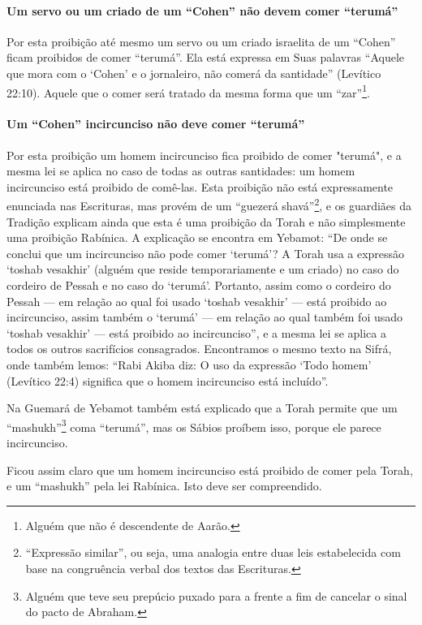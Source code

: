 \paragraph{Um servo ou um criado de um ``Cohen'' não devem comer ``terumá''}

Por esta proibição até mesmo um servo ou um criado israelita de um
``Cohen'' ficam proibidos de comer ``terumá''. Ela está expressa em Suas
palavras ``Aquele que mora com o `Cohen' e o jornaleiro, não comerá da
santidade'' (Levítico 22:10). Aquele que o comer será tratado da mesma
forma que um ``zar''\footnote{Alguém que não é descendente de Aarão.}.

\paragraph{Um ``Cohen'' incircunciso não deve comer ``terumá''}

Por esta proibição um homem incircunciso fica proibido de comer
"terumá", e a mesma lei se aplica no caso de todas as outras santidades:
um homem incircunciso está proibido de comê-las. Esta proibição não está
expressamente enunciada nas Escrituras, mas provém de um ``guezerá
shavá''\footnote{``Expressão similar'', ou seja, uma analogia entre duas leis
  estabelecida com base na congruência verbal dos textos das Escrituras.}, e os guardiães da Tradição explicam ainda
que esta é uma proibição da Torah e não simplesmente uma proibição
Rabínica. A explicação se encontra em Yebamot: ``De onde se conclui que
um incircunciso não pode comer `terumá'? A Torah usa a expressão `toshab
vesakhir' (alguém que reside temporariamente e um criado) no caso do
cordeiro de Pessah e no caso do `terumá'. Portanto, assim como o
cordeiro do Pessah --- em relação ao qual foi usado `toshab vesakhir'
--- está proibido ao incircunciso, assim também o `terumá' --- em
relação ao qual também foi usado `toshab vesakhir' --- está proibido ao
incircunciso'', e a mesma lei se aplica a todos os outros sacrifícios
consagrados. Encontramos o mesmo texto na Sifrá, onde também lemos:
``Rabi Akiba diz: O uso da expressão `Todo homem' (Levítico 22:4)
significa que o homem incircunciso está incluído''.

Na Guemará de Yebamot também está explicado que a Torah permite que um
``mashukh''\footnote{Alguém que teve seu prepúcio puxado para a frente a fim de cancelar o sinal do pacto de Abraham.} coma ``terumá'', mas os Sábios proíbem
isso, porque ele parece incircunciso.

Ficou assim claro que um homem incircunciso está proibido de comer pela
Torah, e um ``mashukh'' pela lei Rabínica. Isto deve ser compreendido.

